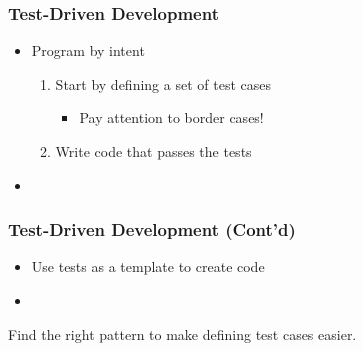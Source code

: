 \documentclass{beamer}
\def\mcolor#1#2{\rule{0ex}{0ex}\color{#1}#2\color{black}{}}
\begin{document}
\begin{frame}
\frametitle{Test-Driven Development}
\begin{itemize}
\item Program by intent
\begin{enumerate}
\item Start by defining a set of test cases
\begin{itemize}
\item Pay attention to border cases!
\end{itemize}
\item Write code that passes the tests
\end{enumerate}

\item\small
%

\end{itemize} %
\end{frame}

\begin{frame}
\frametitle{Test-Driven Development (Cont'd)}

\begin{itemize}
\item Use tests as a template to create code
\item\ \\
\small
%

\end{itemize}

\mcolor{blue}{Find the right pattern to make defining test cases easier.}

\end{frame}
\end{document}
